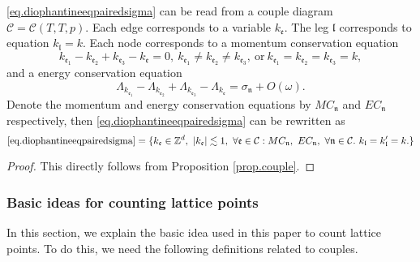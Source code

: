\begin{prop}\label{prop.couple'}
\eqref{eq.diophantineeqpairedsigma} can be read from a couple diagram $\mathcal{C}=\mathcal{C}(T,T,p)$. Each edge corresponds to a variable $k_{\mathfrak{e}}$. The leg $\mathfrak{l}$ corresponds to equation $k_{\mathfrak{l}}=k$. Each node corresponds to a momentum conservation equation
\begin{equation}\label{eq.momentumconservationunit}
    k_{\mathfrak{e}_1}-k_{\mathfrak{e}_2}+k_{\mathfrak{e}_3}-k_{\mathfrak{e}}=0,\ k_{\mathfrak{e}_1}\ne k_{\mathfrak{e}_2}\ne k_{\mathfrak{e}_3},\ \text{or}\ k_{\mathfrak{e}_1}= k_{\mathfrak{e}_2}= k_{\mathfrak{e}_3}=k,
\end{equation} 
and a energy conservation equation 
\begin{equation}\label{eq.energyconservationunit}
    \Lambda_{k_{\mathfrak{e}_1}}-\Lambda_{k_{\mathfrak{e}_2}}+\Lambda_{k_{\mathfrak{e}_3}}-\Lambda_{k_{\mathfrak{e}}} =\sigma_{\mathfrak{n}}+O(\omega).
\end{equation}  
Denote the momentum and energy conservation equations by $MC_{\mathfrak{n}}$ and $EC_{\mathfrak{n}}$ respectively, then \eqref{eq.diophantineeqpairedsigma} can be rewritten as 
\begin{equation}\label{eq.diophantineeqpairedsigma'}
    \text{\eqref{eq.diophantineeqpairedsigma}}=\{k_{\mathfrak{e}}\in \mathbb{Z}^d,\ |k_{\mathfrak{e}}| \lesssim 1,\ \forall \mathfrak{e}\in \mathcal{C}:MC_{\mathfrak{n}},\  EC_{\mathfrak{n}},\ \forall \mathfrak{n}\in \mathcal{C}.\ k_{\mathfrak{l}}=k_{\mathfrak{l}}'=k.\}
\end{equation}
\end{prop}
\begin{proof}
This directly follows from Proposition \ref{prop.couple}. 
\end{proof}

\subsubsection{Basic ideas for counting lattice points} In this section, we explain the basic idea used in this paper to count lattice points. To do this, we need the following definitions related to couples.

